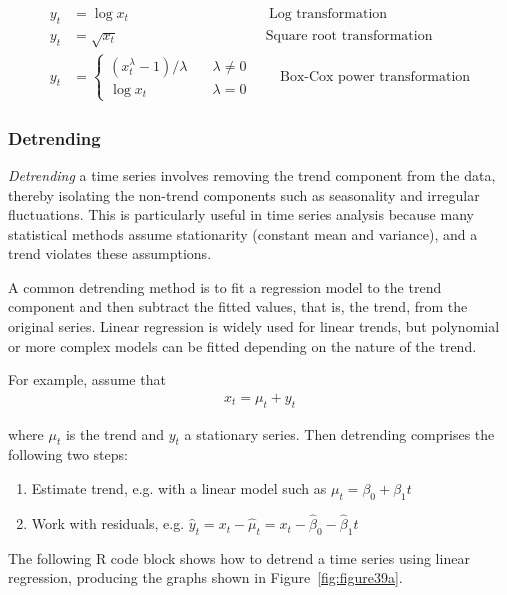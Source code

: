 \begin{align*}y_t &= \log x_t \qquad \qquad \qquad \qquad \qquad \text{Log transformation}\\
  y_t &= \sqrt{x_t} \qquad \qquad \; \; \qquad \qquad \qquad \text{Square root transformation} \\
  y_t &= \begin{cases}(x_t^\lambda-1)/\lambda &\quad \lambda\neq0 \\
  \log x_t &\quad \lambda=0
  \end{cases} \qquad \text{Box-Cox power transformation}
\end{align*}

\subsubsection*{Detrending}

\emph{Detrending} a time series involves removing the trend component from the data, thereby isolating the non-trend components such as seasonality and irregular fluctuations. This is particularly useful in time series analysis because many statistical methods assume stationarity (constant mean and variance), and a trend violates these assumptions.

A common detrending method is to fit a regression model to the trend component and then subtract the fitted values, that is, the trend, from the original series. Linear regression is widely used for linear trends, but polynomial or more complex models can be fitted depending on the nature of the trend.

For example, assume that 
\begin{align*}
x_t = \mu_t + y_t
\end{align*}

where $\mu_t$ is the trend and $y_t$ a stationary series. Then detrending comprises the following two steps:

\begin{enumerate}
  \item Estimate trend, e.g. with a linear model such as $\mu_t = \beta_0 + \beta_1 t$
  \item Work with residuals, e.g. $\hat y_t = x_t - \hat \mu_t = x_t - \hat\beta_0 - \hat\beta_1 t$
\end{enumerate}

The following R code block shows how to detrend a time series using linear regression, producing the graphs shown in Figure~\ref{fig:figure39a}.

